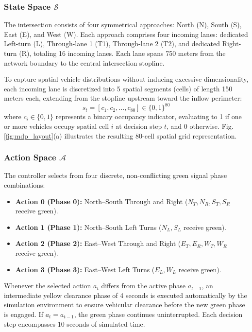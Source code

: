 \documentclass{ieeeaccess}
\begin{document}
\subsubsection{State Space $\mathcal{S}$}
The intersection consists of four symmetrical approaches: North (N), South (S), East (E), and West (W). Each approach comprises four incoming lanes: dedicated Left-turn (L), Through-lane 1 (T1), Through-lane 2 (T2), and dedicated Right-turn (R), totaling 16 incoming lanes. Each lane spans 750 meters from the network boundary to the central intersection stopline.

To capture spatial vehicle distributions without inducing excessive dimensionality, each incoming lane is discretized into 5 spatial segments (cells) of length 150 meters each, extending from the stopline upstream toward the inflow perimeter:
\begin{equation}
s_t = [c_{1}, c_{2}, \dots, c_{80}] \in \{0, 1\}^{80}
\end{equation}
where $c_i \in \{0, 1\}$ represents a binary occupancy indicator, evaluating to 1 if one or more vehicles occupy spatial cell $i$ at decision step $t$, and 0 otherwise. Fig. \ref{fig:mdp_layout}(a) illustrates the resulting 80-cell spatial grid representation.

\subsubsection{Action Space $\mathcal{A}$}
The controller selects from four discrete, non-conflicting green signal phase combinations:
\begin{itemize}
    \item \textbf{Action 0 (Phase 0):} North--South Through and Right ($N_T, N_R, S_T, S_R$ receive green).
    \item \textbf{Action 1 (Phase 1):} North--South Left Turns ($N_L, S_L$ receive green).
    \item \textbf{Action 2 (Phase 2):} East--West Through and Right ($E_T, E_R, W_T, W_R$ receive green).
    \item \textbf{Action 3 (Phase 3):} East--West Left Turns ($E_L, W_L$ receive green).
\end{itemize}
Whenever the selected action $a_t$ differs from the active phase $a_{t-1}$, an intermediate yellow clearance phase of 4 seconds is executed automatically by the simulation environment to ensure vehicular clearance before the new green phase is engaged. If $a_t = a_{t-1}$, the green phase continues uninterrupted. Each decision step encompasses 10 seconds of simulated time.
\end{document}
